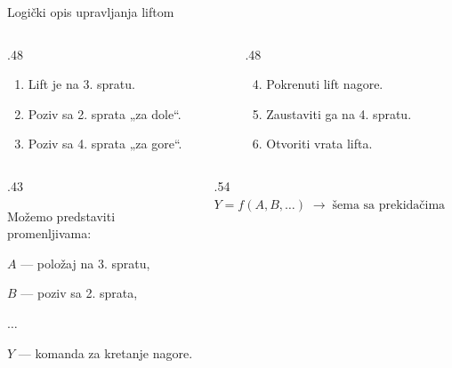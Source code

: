 \begin{frame}[label=01-s009]{Logički opis upravljanja liftom}
\begin{columns}[T,onlytextwidth]
\begin{column}{.48\textwidth}\begin{enumerate}
\item Lift je na 3. spratu.
\item Poziv sa 2. sprata „za dole“.
\item Poziv sa 4. sprata „za gore“.
\end{enumerate}\end{column}
\begin{column}{.48\textwidth}\begin{enumerate}
\setcounter{enumi}{3}
\item Pokrenuti lift nagore.
\item Zaustaviti ga na 4. spratu.
\item Otvoriti vrata lifta.
\end{enumerate}\end{column}\end{columns}
\par\vspace{5mm}
\begin{columns}[T,onlytextwidth]
\begin{column}{.43\textwidth}
{\setlength{\parskip}{0pt}Možemo predstaviti promenljivama:\par
\hspace{3mm}\(A\) — položaj na 3. spratu,\par
\hspace{3mm}\(B\) — poziv sa 2. sprata,\par
\hspace{3mm}\(\ldots\)\par
\hspace{3mm}\(Y\) — komanda za kretanje nagore.\par}
\end{column}
\begin{column}{.54\textwidth}
\centering\vspace{12mm}
\(\boxed{Y=f(A,B,\ldots)}\;\longrightarrow\;\text{šema sa prekidačima}\)
\end{column}
\end{columns}

\end{frame}

